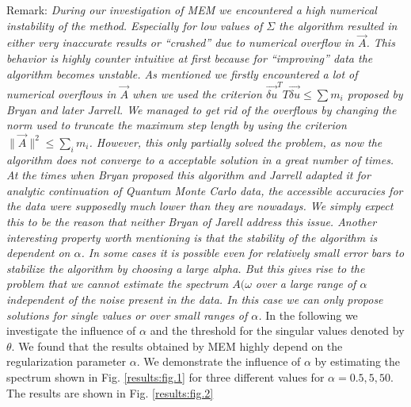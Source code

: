 \FloatBarrier
Remark:\newline
\textit{During our investigation of MEM we encountered a high numerical instability of the method. Especially for low values of $\Sigma$ the algorithm resulted in either very inaccurate results or ``crashed'' due to numerical overflow in $\vec A$. This behavior is highly counter intuitive at first because for ``improving'' data the algorithm becomes unstable. As mentioned we firstly encountered a lot of numerical overflows in $\vec A$ when we used the criterion $\vec{\delta u}^T T \vec{\delta u} \leq \sum m_i$ proposed by Bryan and later Jarrell. We managed to get rid of the overflows by changing the norm used to truncate the maximum step length by using the criterion $\parallel \vec A \parallel^2 \leq \sum_i m_i$. However, this only partially solved the problem, as now the algorithm does not converge to a acceptable solution in a great number of times. At the times when Bryan proposed this algorithm and Jarrell adapted it for analytic continuation of Quantum Monte Carlo data, the accessible accuracies for the data were supposedly much lower than they are nowadays. We simply expect this to be the reason that neither Bryan of Jarell address this issue. Another interesting property worth mentioning is that the stability of the algorithm is dependent on $\alpha$. In some cases it is possible even for relatively small error bars to stabilize the algorithm by choosing a large alpha. But this gives rise to the problem that we cannot estimate the spectrum $A(\omega$ over a large range of $\alpha$ independent of the noise present in the data. In this case we can only propose solutions for single values or over small ranges of $\alpha$.}\newline
In the following we investigate the influence of $\alpha$ and the threshold for the singular values denoted by $\theta$.
We found that the results obtained by MEM highly depend on the regularization parameter $\alpha$. We demonstrate the influence of $\alpha$ by estimating the spectrum shown in Fig. \ref{results:fig.1} for three different values for $\alpha = 0.5,5,50$. The results are shown in Fig. \ref{results:fig.2}
